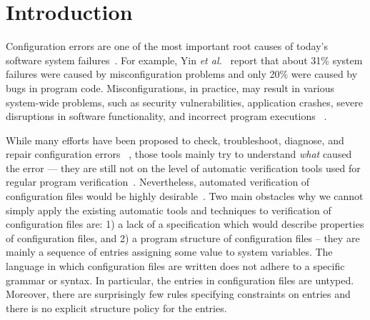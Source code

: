 \section{Introduction}
\label{sec-intro}

Configuration errors are one of the most important root causes of
today's software system failures~\cite{xu15systems, yin11anempirical}.
For example, Yin {\em et al.}~\cite{yin11anempirical} report
that about 31\% system failures were caused by misconfiguration problems and only 20\% were caused by bugs in program code. 
Misconfigurations, in practice, may result in various
system-wide problems, such as security vulnerabilities, 
application crashes, severe disruptions in software
functionality, and incorrect program executions%
~\cite{zhang14encore, yuan11context, xu13do, xu15hey}.  

While many efforts have been proposed 
to check, troubleshoot, diagnose, and repair configuration errors%
~\cite{attariyan10automating,
su07autobash, whitaker04configuration},
those tools mainly try to understand {\emph{what}} caused the error ---
they are still not on the level of
automatic verification tools used for regular program 
verification~\cite{Leino10Dafny, PiskacWZ14, BobotFMP15}.
Nevertheless, automated verification of configuration 
files would be highly
desirable~\cite{wang04automatic, zhang14encore, xu15systems}.
Two main obstacles why we cannot simply apply the existing automatic 
tools and techniques to verification of configuration files are: 1) a lack
of a specification which would describe properties of configuration files, and 2) a program structure of configuration files -- they
are mainly a sequence of entries assigning some value to system variables. The language in which configuration files are written does 
not adhere to a specific grammar or syntax. In particular,  the
entries in configuration files are untyped. Moreover, there are surprisingly few rules specifying constraints on entries and there
is no explicit structure policy for the entries.

